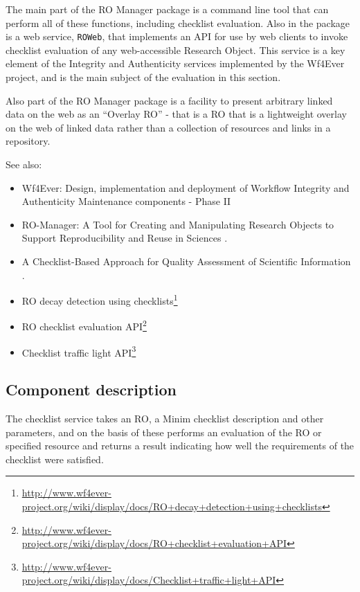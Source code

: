 The main part of the RO Manager package is a command line tool that can
perform all of these functions, including checklist evaluation. Also in
the package is a web service, \texttt{ROWeb}, that implements an API for
use by web clients to invoke checklist evaluation of any web-accessible
Research Object. This service is a key element of the Integrity and
Authenticity services implemented by the Wf4Ever project, and is the
main subject of the evaluation in this section.

Also part of the RO Manager package is a facility to present arbitrary
linked data on the web as an ``Overlay RO'' - that is a RO that is a
lightweight overlay on the web of linked data rather than a collection
of resources and links in a repository.

See also:

\begin{itemize}
\itemsep1pt\parskip0pt
\item
  Wf4Ever: Design, implementation and deployment of Workflow Integrity
  and Authenticity Maintenance components - Phase II \cite{D4.2v2}
\item
  RO-Manager: A Tool for Creating and Manipulating Research Objects to
  Support Reproducibility and Reuse in Sciences \cite{ro_manager}.
\item
  A Checklist-Based Approach for Quality Assessment of Scientific
  Information \cite{ro_checklist}.
\item
  RO decay detection using checklists\footnote{\url{http://www.wf4ever-project.org/wiki/display/docs/RO+decay+detection+using+checklists}}
\item
  RO checklist evaluation API\footnote{\url{http://www.wf4ever-project.org/wiki/display/docs/RO+checklist+evaluation+API}}
\item
  Checklist traffic light API\footnote{\url{http://www.wf4ever-project.org/wiki/display/docs/Checklist+traffic+light+API}}
\end{itemize}

\subsection{Component description}

The checklist service takes an RO, a Minim checklist description and
other parameters, and on the basis of these performs an evaluation of
the RO or specified resource and returns a result indicating how well
the requirements of the checklist were satisfied.

